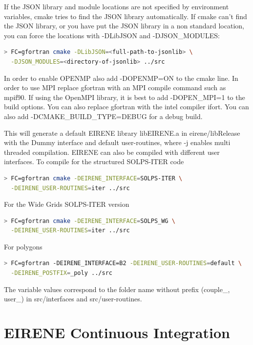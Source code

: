 If the JSON library and module locations are not specified by environment
variables, cmake tries to find the JSON library automatically.
If cmake can't find the JSON library,
or you have put the JSON library in a non standard location, you can force
the locations with -DLibJSON and -DJSON\_MODULES:
\begin{lstlisting}[language=bash,columns=fullflexible]
  > FC=gfortran cmake -DLibJSON=<full-path-to-jsonlib> \
  -DJSON_MODULES=<directory-of-jsonlib> ../src
\end{lstlisting}

In order to enable OPENMP also add -DOPENMP=ON to the cmake line. In order to use MPI replace gfortran with an MPI compile command such as mpif90. If using the OpenMPI library, it is best to add -DOPEN\_MPI=1 to the build options. You can also replace gfortran with the intel compiler ifort. You can also add -DCMAKE\_BUILD\_TYPE=DEBUG for a debug build.

This will generate a default EIRENE library libEIRENE.a in eirene/libRelease with the Dummy interface and default user-routines, where -j enables multi threaded compilation. EIRENE can also be compiled with different user interfaces. To compile for the structured SOLPS-ITER code

\begin{lstlisting}[language=bash,columns=fullflexible]
  > FC=gfortran cmake -DEIRENE_INTERFACE=SOLPS-ITER \
  -DEIRENE_USER-ROUTINES=iter ../src
\end{lstlisting}

For the Wide Grids SOLPS-ITER version
\begin{lstlisting}[language=bash,columns=fullflexible]
  > FC=gfortran cmake -DEIRENE_INTERFACE=SOLPS_WG \
  -DEIRENE_USER-ROUTINES=iter ../src
\end{lstlisting}

For polygons
\begin{lstlisting}[language=bash,columns=fullflexible]
  > FC=gfortran -DEIRENE_INTERFACE=B2 -DEIRENE_USER-ROUTINES=default \
  -DEIRENE_POSTFIX=_poly ../src
\end{lstlisting}

The variable values correspond to the folder name without prefix (couple\_, user\_) in src/interfaces and src/user-routines.



\section{EIRENE Continuous Integration}

